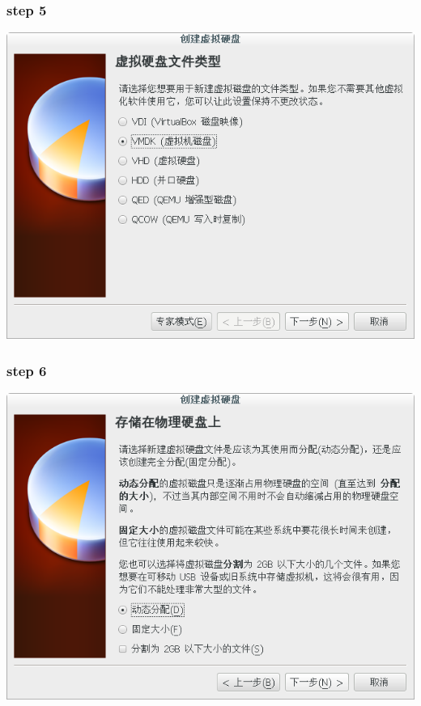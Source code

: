 \documentclass[xcolor=svgnames,presentation]{beamer}
\begin{document}
\begin{frame}
\frametitle{step 5}
\label{sec-1-5}

\begin{center}
\includegraphics[width=.9\linewidth]{img/vb07.png}
\end{center}
\end{frame}
\begin{frame}
\frametitle{step 6}
\label{sec-1-6}

\begin{center}
\includegraphics[width=.9\linewidth]{img/vb08.png}
\end{center}
\end{frame}
\end{document}
